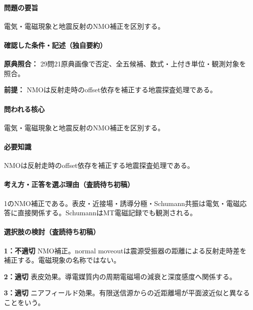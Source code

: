 \paragraph{問題の要旨} 電気・電磁現象と地震反射のNMO補正を区別する。

\paragraph{確認した条件・記述（独自要約）}\mbox{}\par

\noindent\textbf{原典照合：} 29問21原典画像で否定、全五候補、数式・上付き単位・観測対象を照合。\par

\noindent\textbf{前提：} NMOは反射走時のoffset依存を補正する地震探査処理である。\par

\paragraph{問われる核心} 電気・電磁現象と地震反射のNMO補正を区別する。

\paragraph{必要知識} NMOは反射走時のoffset依存を補正する地震探査処理である。

\paragraph{考え方・正答を選ぶ理由（査読待ち初稿）} 1のNMO補正である。表皮・近接場・誘導分極・Schumann共振は電気・電磁応答に直接関係する。SchumannはMT電磁記録でも観測される。

\paragraph{選択肢の検討（査読待ち初稿）}\mbox{}\par

\noindent\textbf{1：不適切} NMO補正。normal moveoutは震源受振器の距離による反射走時差を補正する。電磁現象の名称ではない。\par

\noindent\textbf{2：適切} 表皮効果。導電媒質内の周期電磁場の減衰と深度感度へ関係する。\par

\noindent\textbf{3：適切} ニアフィールド効果。有限送信源からの近距離場が平面波近似と異なることをいう。\par

